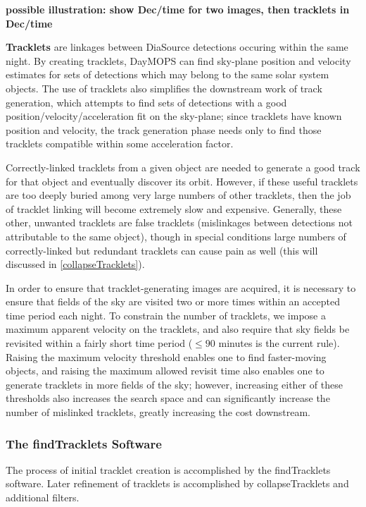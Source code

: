 \textbf{ possible illustration: show Dec/time for two images, then tracklets in Dec/time}

\textbf{Tracklets} are linkages between DiaSource detections occuring
within the same night. By creating tracklets, DayMOPS can find
sky-plane position and velocity estimates for sets of detections which
may belong to the same solar system objects.  The use of tracklets
also simplifies the downstream work of track generation, which
attempts to find sets of detections with a good
position/velocity/acceleration fit on the sky-plane; since tracklets
have known position and velocity, the track generation phase needs
only to find those tracklets compatible within some acceleration
factor.

Correctly-linked tracklets from a given object are needed to generate
a good track for that object and eventually discover its orbit.
However, if these useful tracklets are too deeply buried among very
large numbers of other tracklets, then the job of tracklet linking
will become extremely slow and expensive.  Generally, these other,
unwanted tracklets are false tracklets (mislinkages between detections
not attributable to the same object), though in special conditions
large numbers of correctly-linked but redundant tracklets can cause
pain as well (this will discussed in \ref{collapseTracklets}).

In order to ensure that tracklet-generating images are acquired, it is
necessary to ensure that fields of the sky are visited two or more
times within an accepted time period each night. To constrain the
number of tracklets, we impose a maximum apparent velocity on the
tracklets, and also require that sky fields be revisited within a
fairly short time period ($\leq 90$ minutes is the current rule).
Raising the maximum velocity threshold enables one to find
faster-moving objects, and raising the maximum allowed revisit time
also enables one to generate tracklets in more fields of the sky;
however, increasing either of these thresholds also increases the
search space and can significantly increase the number of mislinked
tracklets, greatly increasing the cost downstream.




\subsubsection{The findTracklets Software}

The process of initial tracklet creation is accomplished by the
findTracklets software.  Later refinement of tracklets is accomplished
by collapseTracklets and additional filters.

